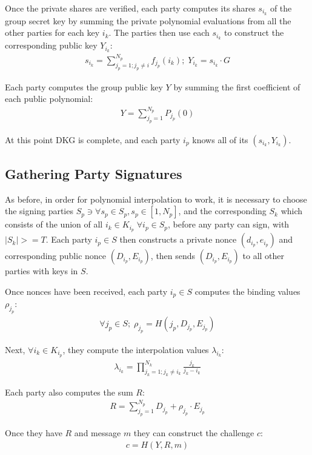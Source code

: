 \documentclass{article}
\begin{document}
Once the private shares are verified, each party computes its shares $s_{i_k}$ of the group secret key by summing the private polynomial evaluations from all the other parties for each key $i_k$. The parties then use each $s_{i_k}$ to construct the corresponding public key $Y_{i_k}$:
\begin{align}
  s_{i_k} = \sum_{j_p = 1; j_p \neq i}^{N_p} f_{j_p}(i_k) ;\; Y_{i_k} = s_{i_k} \cdot G
\end{align}

Each party computes the group public key $Y$ by summing the first coefficient of each public polynomial:
\begin{align}
  Y = \sum_{j_p=1}^{N_p} P_{j_p}(0)
\end{align}

At this point DKG is complete, and each party $i_p$ knows all of its $(s_{i_k}, Y_{i_k})$.

\subsection{
  Gathering Party Signatures
}

As before, in order for polynomial interpolation to work, it is necessary to choose the signing parties $S_p \ni \forall s_p \in S_p, s_p \in [1, N_p]$, and the corresponding $S_k$ which consists of the union of all $i_k \in K_{i_p}\; \forall i_p \in S_p$, before any party can sign, with $|S_k| >= T$.  Each party $i_p \in S$ then constructs a private nonce $(d_{i_p},e_{i_p})$ and corresponding public nonce $(D_{i_p},E_{i_p})$, then sends $(D_{i_p},E_{i_p})$ to all other parties with keys in $S$.

Once nonces have been received, each party $i_p \in S$ computes the binding values $\rho_{j_p}$:
\begin{align}
  \forall j_p \in S;\;\rho_{j_p} = H(j_p, D_{j_p}, E_{j_p})
\end{align}

Next, $\forall i_k \in K_{i_p}$,  they compute the interpolation values $\lambda_{i_k}$:
\begin{align}
  \lambda_{i_k} = \prod_{j_k=1; j_k \neq i_k}^{N_k} \frac{j_k}{j_k - i_k}
\end{align}

Each party also computes the sum $R$:
\begin{align}
  R = \sum_{j_p=1}^{N_p} D_{j_p} + \rho_{j_p} \cdot E_{j_p}
\end{align}

Once they have $R$ and message $m$ they can construct the challenge $c$:
\begin{align}
  c = H(Y, R, m)
\end{align}
\end{document}
